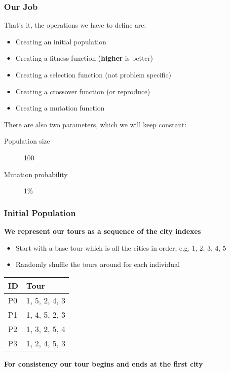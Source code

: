 \documentclass[aspectratio=169,10pt,compress]{beamer}
\begin{document}
\begin{frame}
  \frametitle{Our Job}

  That's it, the operations we have to define are:
  \begin{itemize}
    \item Creating an initial population
    \item Creating a fitness function ({\bf higher} is better)
    \item Creating a selection function (not problem specific)
    \item Creating a crossover function (or reproduce)
    \item Creating a mutation function
  \end{itemize}

  \vfill

  There are also two parameters, which we will keep constant:
  \begin{description}
    \item[Population size] 100
    \item[Mutation probability] 1\%
  \end{description}
\end{frame}

\begin{frame}
  \frametitle{Initial Population}

  {\bf We represent our tours as a sequence of the city indexes}

  \begin{itemize}
    \item Start with a base tour which is all the cities in order, e.g. 1, 2, 3, 4, 5
    \item Randomly shuffle the tours around for each individual
  \end{itemize}

  \begin{center}
    \begin{tabular}{ll}
      \toprule
      ID & Tour\\
      \midrule
      P0 & 1, 5, 2, 4, 3\\
      P1 & 1, 4, 5, 2, 3\\
      P2 & 1, 3, 2, 5, 4\\
      P3 & 1, 2, 4, 5, 3\\
      \bottomrule
    \end{tabular}
  \end{center}

  {\bf For consistency our tour begins and ends at the first city}
\end{frame}
\end{document}
